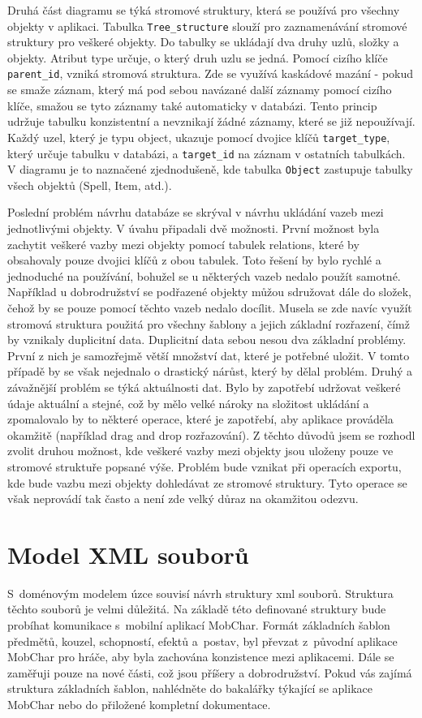 \documentclass[thesis=B,czech]{resources/FITthesis}[2012/06/26]
\begin{document}
Druhá část diagramu se týká stromové struktury, která se používá pro všechny objekty v aplikaci. Tabulka \texttt{Tree\_structure} slouží pro zaznamenávání stromové struktury pro veškeré objekty. Do tabulky se ukládají dva druhy uzlů, složky a objekty. Atribut type určuje, o který druh uzlu se jedná. Pomocí cizího klíče \texttt{parent\_id}, vzniká stromová struktura. Zde se využívá kaskádové mazání - pokud se smaže záznam, který má pod sebou navázané další záznamy pomocí cizího klíče, smažou se tyto záznamy také automaticky v databázi. Tento princip udržuje tabulku konzistentní a nevznikají žádné záznamy, které se již nepoužívají. Každý uzel, který je typu object, ukazuje pomocí dvojice klíčů \texttt{target\_type}, který určuje tabulku v databázi, a \texttt{target\_id} na záznam v ostatních tabulkách. V diagramu je to naznačené zjednodušeně, kde tabulka \texttt{Object} zastupuje tabulky všech objektů (Spell, Item, atd.). \par

Poslední problém návrhu databáze se skrýval v návrhu ukládání vazeb mezi jednotlivými objekty. V úvahu připadali dvě možnosti. První možnost byla zachytit veškeré vazby mezi objekty pomocí tabulek relations, které by obsahovaly pouze dvojici klíčů z obou tabulek. Toto řešení by bylo rychlé a jednoduché na používání, bohužel se u některých vazeb nedalo použít samotné. Například u dobrodružství se podřazené objekty můžou sdružovat dále do složek, čehož by se pouze pomocí těchto vazeb nedalo docílit. Musela se zde navíc využít stromová struktura použitá pro všechny šablony a jejich základní rozřazení, čímž by vznikaly duplicitní data. Duplicitní data sebou nesou dva základní problémy. První z nich je samozřejmě větší množství dat, které je potřebné uložit. V tomto případě by se však nejednalo o drastický nárůst, který by dělal problém. Druhý a závažnější problém se týká aktuálnosti dat. Bylo by zapotřebí udržovat veškeré údaje aktuální a stejné, což by mělo velké nároky na složitost ukládání a zpomalovalo by to některé operace, které je zapotřebí, aby aplikace prováděla okamžitě (například drag and drop rozřazování). Z těchto důvodů jsem se rozhodl zvolit druhou možnost, kde veškeré vazby mezi objekty jsou uloženy pouze ve stromové struktuře popsané výše. Problém bude vznikat při operacích exportu, kde bude vazbu mezi objekty dohledávat ze stromové struktury. Tyto operace se však neprovádí tak často a není zde velký důraz na okamžitou odezvu. 

	\section{Model XML souborů}
S~doménovým modelem úzce souvisí návrh struktury xml souborů. Struktura těchto souborů je velmi důležitá. Na základě této definované struktury bude probíhat komunikace s~mobilní aplikací MobChar. Formát základních šablon předmětů, kouzel, schopností, efektů a~postav, byl převzat z~původní aplikace MobChar pro hráče, aby byla zachována konzistence mezi aplikacemi. Dále se zaměřuji pouze na nové části, což jsou příšery a dobrodružství. Pokud vás zajímá struktura základních šablon, nahlédněte do bakalářky týkající se aplikace MobChar\cite{Weberova_2017} nebo do přiložené kompletní dokumentace.\par
\end{document}
